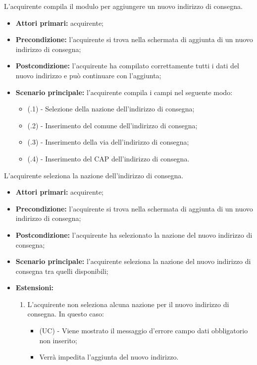 L'acquirente compila il modulo per aggiungere un nuovo indirizzo di consegna.
\begin{itemize}
	\item \textbf{Attori primari:} acquirente;
	\item \textbf{Precondizione:} l'acquirente si trova nella schermata di aggiunta di un nuovo indirizzo di consegna;
	\item \textbf{Postcondizione:} l'acquirente ha compilato correttamente tutti i dati del nuovo indirizzo e può continuare con l'aggiunta;
	\item \textbf{Scenario principale:} l'acquirente compila i campi nel seguente modo:
	\begin{itemize}
		\item (\actualSubUC.1) - Selezione della nazione dell'indirizzo di consegna;
		\item (\actualSubUC.2) - Inserimento del comune dell'indirizzo di consegna;
		\item (\actualSubUC.3) - Inserimento della via dell'indirizzo di consegna;
		\item (\actualSubUC.4) - Inserimento del CAP dell'indirizzo di consegna.
	\end{itemize}
\end{itemize}

\resetSubSubUC

L'acquirente seleziona la nazione dell'indirizzo di consegna.
\begin{itemize}
    \item \textbf{Attori primari:} acquirente;
    \item \textbf{Precondizione:} l'acquirente si trova nella schermata di aggiunta di un nuovo indirizzo di consegna;
    \item \textbf{Postcondizione:} l'acquirente ha selezionato la nazione del nuovo indirizzo di consegna;
    \item \textbf{Scenario principale:} l'acquirente seleziona la nazione del nuovo indirizzo di consegna tra quelli disponibili;
    \item \textbf{Estensioni:}
    \begin{enumerate}[label=\lett]
        \item L'acquirente non seleziona alcuna nazione per il nuovo indirizzo di consegna. In questo caso:
        \begin{itemize}
            \item (UC) - Viene mostrato il messaggio d'errore campo dati obbligatorio non inserito;
            \item Verrà impedita l'aggiunta del nuovo indirizzo.
        \end{itemize}
    \end{enumerate}
\end{itemize}

